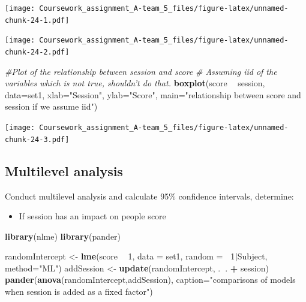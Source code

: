 \documentclass[]{article}
\newenvironment{Shaded}{\begin{snugshade}}{\end{snugshade}}
\newcommand{\KeywordTok}[1]{\textcolor[rgb]{0.13,0.29,0.53}{\textbf{#1}}}
\newcommand{\DataTypeTok}[1]{\textcolor[rgb]{0.13,0.29,0.53}{#1}}
\newcommand{\DecValTok}[1]{\textcolor[rgb]{0.00,0.00,0.81}{#1}}
\newcommand{\StringTok}[1]{\textcolor[rgb]{0.31,0.60,0.02}{#1}}
\newcommand{\CommentTok}[1]{\textcolor[rgb]{0.56,0.35,0.01}{\textit{#1}}}
\newcommand{\OperatorTok}[1]{\textcolor[rgb]{0.81,0.36,0.00}{\textbf{#1}}}
\newcommand{\NormalTok}[1]{#1}
\providecommand{\tightlist}{%
  \setlength{\itemsep}{0pt}\setlength{\parskip}{0pt}}
\begin{document}
\texttt{[image: Coursework\_assignment\_A-team\_5\_files/figure-latex/unnamed-chunk-24-1.pdf]}

\begin{Shaded}
\end{Shaded}

\texttt{[image: Coursework\_assignment\_A-team\_5\_files/figure-latex/unnamed-chunk-24-2.pdf]}

\begin{Shaded}
\begin{Highlighting}[]
\CommentTok{#Plot of the relationship between session and score}
\CommentTok{# Assuming iid of the variables which is not true, shouldn't do that.}
\KeywordTok{boxplot}\NormalTok{(score }\OperatorTok{~}\StringTok{ }\NormalTok{session, }\DataTypeTok{data=}\NormalTok{set1, }\DataTypeTok{xlab=}\StringTok{"Session"}\NormalTok{, }\DataTypeTok{ylab=}\StringTok{"Score"}\NormalTok{, }\DataTypeTok{main=}\StringTok{"relationship between score and session if we assume iid"}\NormalTok{)}
\end{Highlighting}
\end{Shaded}

\texttt{[image: Coursework\_assignment\_A-team\_5\_files/figure-latex/unnamed-chunk-24-3.pdf]}

\subsection{Multilevel analysis}\label{multilevel-analysis}

Conduct multilevel analysis and calculate 95\% confidence intervals,
determine:

\begin{itemize}
\tightlist
\item
  If session has an impact on people score
\end{itemize}

\begin{Shaded}
\begin{Highlighting}[]
\KeywordTok{library}\NormalTok{(nlme)}
\KeywordTok{library}\NormalTok{(pander)}

\NormalTok{randomIntercept <-}\StringTok{ }\KeywordTok{lme}\NormalTok{(score }\OperatorTok{~}\StringTok{ }\DecValTok{1}\NormalTok{, }\DataTypeTok{data =}\NormalTok{ set1, }\DataTypeTok{random =} \OperatorTok{~}\DecValTok{1}\OperatorTok{|}\NormalTok{Subject, }\DataTypeTok{method=}\StringTok{"ML"}\NormalTok{)}
\NormalTok{addSession <-}\StringTok{ }\KeywordTok{update}\NormalTok{(randomIntercept, .}\OperatorTok{~}\NormalTok{. }\OperatorTok{+}\StringTok{ }\NormalTok{session)}
\KeywordTok{pander}\NormalTok{(}\KeywordTok{anova}\NormalTok{(randomIntercept,addSession), }\DataTypeTok{caption=}\StringTok{"comparisons of models when session is added as a fixed factor"}\NormalTok{)}
\end{Highlighting}
\end{Shaded}
\end{document}
